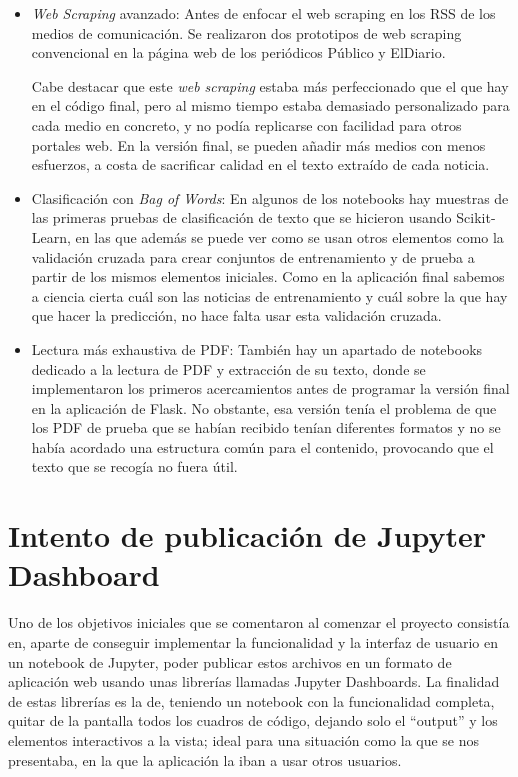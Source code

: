 \begin{itemize}

\item \emph{Web Scraping} avanzado: Antes de enfocar el web scraping en los RSS de los medios de comunicación. Se realizaron dos prototipos de web scraping convencional en la página web de los periódicos Público y ElDiario.

Cabe destacar que este \emph{web scraping} estaba más perfeccionado que el que hay en el código final, pero al mismo tiempo estaba demasiado personalizado para cada medio en concreto, y no podía replicarse con facilidad para otros portales web. En la versión final, se pueden añadir más medios con menos esfuerzos, a costa de sacrificar calidad en el texto extraído de cada noticia.

\item Clasificación con \emph{Bag of Words}: En algunos de los notebooks hay muestras de las primeras pruebas de clasificación de texto que se hicieron usando Scikit-Learn, en las que además se puede ver como se usan otros elementos como la validación cruzada para crear conjuntos de entrenamiento y de prueba a partir de los mismos elementos iniciales. Como en la aplicación final sabemos a ciencia cierta cuál son las noticias de entrenamiento y cuál sobre la que hay que hacer la predicción, no hace falta usar esta validación cruzada.

\item Lectura más exhaustiva de PDF: También hay un apartado de notebooks dedicado a la lectura de PDF y extracción de su texto, donde se implementaron los primeros acercamientos antes de programar la versión final en la aplicación de Flask. No obstante, esa versión tenía el problema de que los PDF de prueba que se habían recibido tenían diferentes formatos y no se había acordado una estructura común para el contenido, provocando que el texto que se recogía no fuera útil.

\end{itemize}

\section{Intento de publicación de Jupyter Dashboard}

Uno de los objetivos iniciales que se comentaron al comenzar el proyecto consistía en, aparte de conseguir implementar la funcionalidad y la interfaz de usuario en un notebook de Jupyter, poder publicar estos archivos en un formato de aplicación web usando unas librerías llamadas Jupyter Dashboards. La finalidad de estas librerías es la de, teniendo un notebook con la funcionalidad completa, quitar de la pantalla todos los cuadros de código, dejando solo el ``output'' y los elementos interactivos a la vista; ideal para una situación como la que se nos presentaba, en la que la aplicación la iban a usar otros usuarios.

